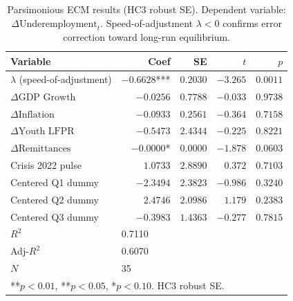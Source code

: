 \begin{table}[h]
\caption{Parsimonious ECM results (HC3 robust SE). Dependent variable:
  $\Delta\text{Underemployment}_t$. Speed-of-adjustment $\lambda < 0$
  confirms error correction toward long-run equilibrium.}
\label{tab:ecm_results}
\footnotesize
\begin{tabular}{lrrrr}
\toprule
\textbf{Variable} & \textbf{Coef} & \textbf{SE} & \textbf{$t$} & \textbf{$p$} \\
\midrule
  $\lambda$ (speed-of-adjustment) & $-0.6628$*** & $0.2030$ & $-3.265$ & $0.0011$ \\
  $\Delta\text{GDP Growth}$ & $-0.0256$ & $0.7788$ & $-0.033$ & $0.9738$ \\
  $\Delta\text{Inflation}$ & $-0.0933$ & $0.2561$ & $-0.364$ & $0.7158$ \\
  $\Delta\text{Youth LFPR}$ & $-0.5473$ & $2.4344$ & $-0.225$ & $0.8221$ \\
  $\Delta\text{Remittances}$ & $-0.0000$* & $0.0000$ & $-1.878$ & $0.0603$ \\
  Crisis 2022 pulse & $1.0733$ & $2.8890$ & $0.372$ & $0.7103$ \\
  Centered Q1 dummy & $-2.3494$ & $2.3823$ & $-0.986$ & $0.3240$ \\
  Centered Q2 dummy & $2.4746$ & $2.0986$ & $1.179$ & $0.2383$ \\
  Centered Q3 dummy & $-0.3983$ & $1.4363$ & $-0.277$ & $0.7815$ \\
\midrule
  $R^2$ & \multicolumn{4}{l}{0.7110} \\
  Adj-$R^2$ & \multicolumn{4}{l}{0.6070} \\
  $N$ & \multicolumn{4}{l}{35} \\
\bottomrule
\multicolumn{5}{l}{\scriptsize ***$p{<}0.01$, **$p{<}0.05$, *$p{<}0.10$. HC3 robust SE.} \\
\end{tabular}
\end{table}